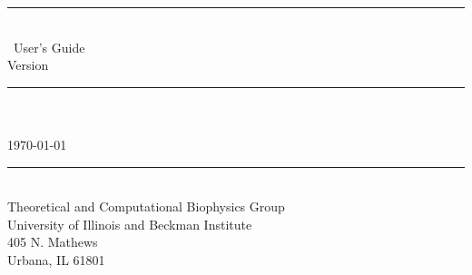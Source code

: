 
\thispagestyle{empty}

\vspace*{0.3in}

\begin{centering}
  \rule{6in}{0.04in}				\\	\vspace{0.25in}
  {\Huge \PSFGEN\ User's Guide}			\\	\vspace{0.25in}
  {\Large Version \PSFGENVER}			\\	\vspace{0.20in}
  \rule{6in}{0.04in}				\\	\vspace{0.25in}
  {\Large \PSFGENAUTHORS}			\\	\vspace{0.20in}
  \today					\\	\vspace{0.20in}
  \rule{6in}{0.04in}				\\	\vspace{0.25in}
  {\large       Theoretical and Computational Biophysics Group}\\ 
  {\large       University of Illinois and Beckman Institute}  \\ 
  {\large       405 N. Mathews}                                \\ 
  {\large       Urbana, IL  61801}                             \\
\end{centering}
\vspace{0.2in}


